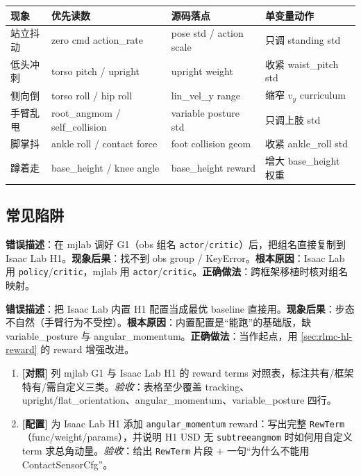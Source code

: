 \begin{center}
\small
\begin{tabular}{p{2.0cm}p{2.8cm}p{2.6cm}p{3.0cm}}
\hline
现象 & 优先读数 & 源码落点 & 单变量动作 \\
\hline
站立抖动 & zero cmd action\_rate & pose std / action scale & 只调 standing std \\
低头冲刺 & torso pitch / upright & upright weight & 收紧 waist\_pitch std \\
侧向倒 & torso roll / hip roll & lin\_vel\_y range & 缩窄 $v_y$ curriculum \\
手臂乱甩 & root\_angmom / self\_collision & variable posture std & 只调上肢 std \\
脚掌抖 & ankle roll / contact force & foot collision geom & 收紧 ankle\_roll std \\
蹲着走 & base\_height / knee angle & base\_height reward & 增大 base\_height 权重 \\
\hline
\end{tabular}
\end{center}

\subsection{常见陷阱}
\begin{pitfall}
\textbf{错误描述}：在 mjlab 调好 G1（obs 组名 \texttt{actor}/\allowbreak\texttt{critic}）后，把组名直接复制到 Isaac Lab H1。\textbf{现象后果}：找不到 obs group / KeyError。\textbf{根本原因}：Isaac Lab 用 \texttt{policy}/\allowbreak\texttt{critic}，mjlab 用 \texttt{actor}/\allowbreak\texttt{critic}。\textbf{正确做法}：跨框架移植时核对组名映射。
\end{pitfall}

\begin{pitfall}
\textbf{错误描述}：把 Isaac Lab 内置 H1 配置当成最优 baseline 直接用。\textbf{现象后果}：步态不自然（手臂行为不受控）。\textbf{根本原因}：内置配置是“能跑”的基础版，缺 variable\_posture 与 angular\_momentum。\textbf{正确做法}：当作起点，用 \cref{sec:rlmc-hl-reward} 的 reward 增强改进。
\end{pitfall}

\begin{practice}[本节动手]
\begin{enumerate}
  \item \textbf{[对照]} 列 mjlab G1 与 Isaac Lab H1 的 reward terms 对照表，标注共有/框架特有/需自定义三类。\emph{验收}：表格至少覆盖 tracking、upright/flat\_orientation、angular\_momentum、variable\_posture 四行。
  \item \textbf{[配置]} 为 Isaac Lab H1 添加 \texttt{angular\_momentum} reward：写出完整 \texttt{RewTerm}（func/weight/params），并说明 H1 USD 无 \texttt{subtreeangmom} 时如何用自定义 term 求总角动量。\emph{验收}：给出 \texttt{RewTerm} 片段 $+$ 一句“为什么不能用 ContactSensorCfg”。
\end{enumerate}
\end{practice}

